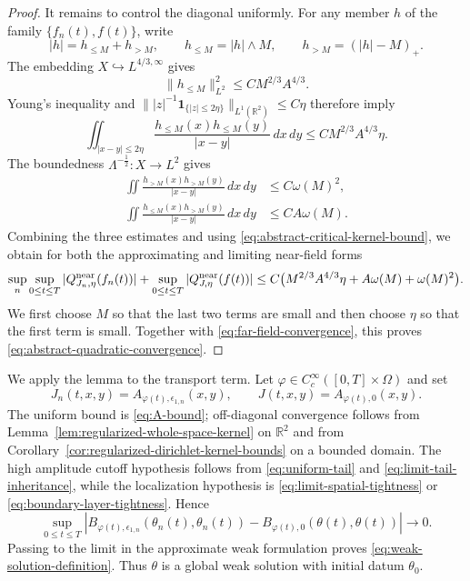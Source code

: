 \documentclass[11pt,reqno]{amsproc}
\newcommand{\R}{\mathbb R}
\newcommand{\Om}{\Omega}
\newcommand{\one}{\mathbf 1}
\newcommand{\dd}{\,d}
\begin{document}
\begin{proof}
It remains to control the diagonal uniformly.  For any member $h$ of the
family $\{f_n(t),f(t)\}$, write
\[
  |h|=h_{\leq M}+h_{>M},
  \qquad
  h_{\leq M}=|h|\wedge M,
  \qquad
  h_{>M}=(|h|-M)_+.
\]
The embedding $X\hookrightarrow L^{4/3,\infty}$ 
gives
\[
  \|h_{\leq M}\|_{L^2}^2
  \leq C M^{2/3}A^{4/3}.
\]
Young's inequality and
$\||z|^{-1}\one_{\{|z|\leq2\eta\}}\|_{L^1(\R^2)}\leq C\eta$ therefore
imply
\begin{equation}\label{eq:near-bounded-part}
 \iint_{|x-y|\leq2\eta}
 \frac{h_{\leq M}(x)h_{\leq M}(y)}{|x-y|}\dd x\dd y
 \leq C M^{2/3}A^{4/3}\eta.
\end{equation}
The boundedness $\Lambda^{-\frac{1}{2}}:X\to L^2$ gives
\begin{align}
 \iint\frac{h_{>M}(x)h_{>M}(y)}{|x-y|}\dd x\dd y
 &\leq C\omega(M)^2,
 \label{eq:near-high-part}\\
 \iint\frac{h_{\leq M}(x)h_{>M}(y)}{|x-y|}\dd x\dd y
 &\leq C A\omega(M).
 \label{eq:near-mixed-part}
\end{align}
Combining the three estimates and using
\eqref{eq:abstract-critical-kernel-bound}, we obtain for both the
approximating and limiting near-field forms
\begin{equation}\label{eq:near-small}
 \sup_n\sup_{0\leq t\leq T}|Q_{J_n,\eta}^{\rm near}(f_n(t))|
 +\sup_{0\leq t\leq T}|Q_{J,\eta}^{\rm near}(f(t))|
 \leq C\bigl(M^{2/3}A^{4/3}\eta+A\omega(M)+\omega(M)^2\bigr).
\end{equation}
We first choose $M$ so that the last two terms are small and then choose $\eta$
so that the first term is small.  Together with
\eqref{eq:far-field-convergence}, this proves
\eqref{eq:abstract-quadratic-convergence}.
\end{proof}

We apply the lemma to the transport term.  Let
$\varphi\in C_c^\infty([0,T]\times\Om)$ and set
\[
  J_n(t,x,y)=A_{\varphi(t),\epsilon_{1,n}}(x,y),
  \qquad
  J(t,x,y)=A_{\varphi(t),0}(x,y).
\]
The uniform bound is \eqref{eq:A-bound}; off-diagonal convergence follows
from Lemma~\ref{lem:regularized-whole-space-kernel} on $\R^2$ and from
Corollary~\ref{cor:regularized-dirichlet-kernel-bounds} on a bounded domain.
The high amplitude cutoff  hypothesis follows from \eqref{eq:uniform-tail} and
\eqref{eq:limit-tail-inheritance}, while the localization hypothesis is
\eqref{eq:limit-spatial-tightness} or
\eqref{eq:boundary-layer-tightness}.  Hence
\begin{equation}\label{eq:nonlinear-convergence}
 \sup_{0\leq t\leq T}
 \left|
 B_{\varphi(t),\epsilon_{1,n}}(\theta_n(t),\theta_n(t))
 -B_{\varphi(t),0}(\theta(t),\theta(t))
 \right|\longrightarrow0.
\end{equation}
Passing to the limit in the approximate weak formulation proves
\eqref{eq:weak-solution-definition}.  Thus $\theta$ is a global weak solution
with initial datum $\theta_0$.
\end{document}
